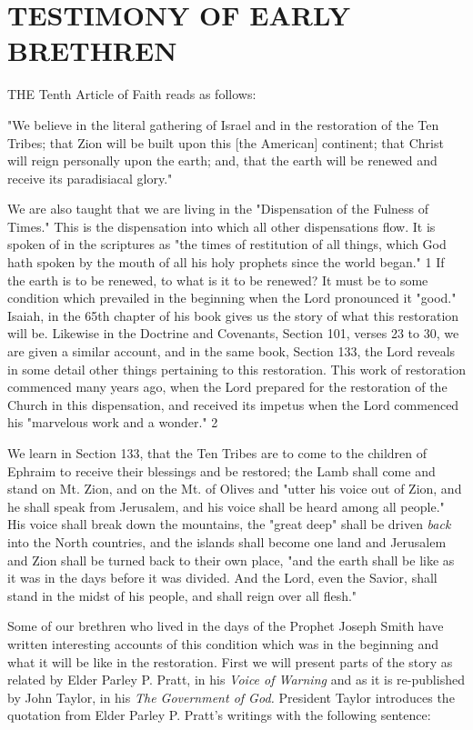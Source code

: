 \chapter{TESTIMONY OF EARLY BRETHREN}

THE Tenth Article of Faith reads as follows:

"We believe in the literal gathering of Israel and in the restoration of the Ten Tribes; that
Zion will be built upon this [the American] continent; that Christ will reign personally upon
the earth; and, that the earth will be renewed and receive its paradisiacal glory."

We are also taught that we are living in the "Dispensation of the Fulness of Times." This is
the dispensation into which all other dispensations flow. It is spoken of in the scriptures as
"the times of restitution of all things, which God hath spoken by the mouth of all his holy
prophets since the world began." 1 If the earth is to be renewed, to what is it to be renewed?
It must be to some condition which prevailed in the beginning when the Lord pronounced it
"good." Isaiah, in the 65th chapter of his book gives us the story of what this restoration will
be. Likewise in the Doctrine and Covenants, Section 101, verses 23 to 30, we are given a
similar account, and in the same book, Section 133, the Lord reveals in some detail other
things pertaining to this restoration. This work of restoration commenced many years ago,
when the Lord prepared for the restoration of the Church in this dispensation, and received its
impetus when the Lord commenced his "marvelous work and a wonder." 2

We learn in Section 133, that the Ten Tribes are to come to the children of Ephraim to
receive their blessings and be restored; the Lamb shall come and stand on Mt. Zion, and on
the Mt. of Olives and "utter his voice out of Zion, and he shall speak from Jerusalem, and his
voice shall be heard among all people." His voice shall break down the mountains, the "great
deep" shall be driven \textit{back} into the North countries, and the islands shall become one land
and Jerusalem and Zion shall be turned back to their own place, "and the earth shall be like as
it was in the days before it was divided. And the Lord, even the Savior, shall stand in the
midst of his people, and shall reign over all flesh."

Some of our brethren who lived in the days of the Prophet Joseph Smith have written
interesting accounts of this condition which was in the beginning and what it will be like in
the restoration. First we will present parts of the story as related by Elder Parley P. Pratt, in
his \textit{Voice of Warning} and as it is re-published by John Taylor, in his \textit{The Government of God.}
President Taylor introduces the quotation from Elder Parley P. Pratt's writings with the
following sentence:

